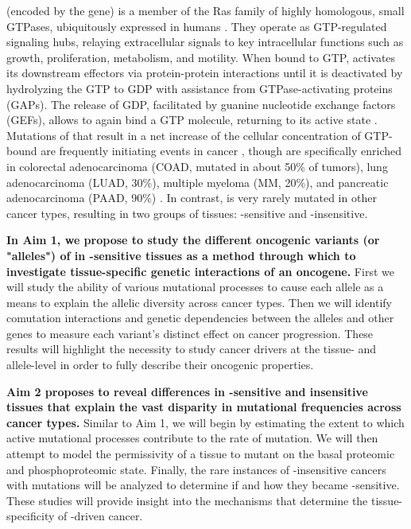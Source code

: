 \kras{} (encoded by the \KRAS{} gene) is a member of the Ras family of highly homologous, small GTPases, ubiquitously expressed in humans \cite{Barbacid1987, Prior2012}. 
They operate as GTP-regulated signaling hubs, relaying extracellular signals to key intracellular functions such as growth, proliferation, metabolism, and motility. 
When bound to GTP, \kras{} activates its downstream effectors via protein-protein interactions until it is deactivated by hydrolyzing the GTP to GDP with assistance from GTPase-activating proteins (GAPs). 
The release of GDP, facilitated by guanine nucleotide exchange factors (GEFs), allows \kras{} to again bind a GTP molecule, returning to its active state \cite{Barbacid1987, Johnson2017}. 
Mutations of \KRAS{} that result in a net increase of the cellular concentration of GTP-bound \kras{} are frequently initiating events in cancer \cite{Kanda2012, Zhang2014a, Li2018, Prior2020TheCancer}, though are specifically enriched in colorectal adenocarcinoma (COAD, mutated in about 50\% of tumors), lung adenocarcinoma (LUAD, 30\%), multiple myeloma (MM, 20\%), and pancreatic adenocarcinoma (PAAD, 90\%) \cite{Prior2020TheCancer}.
In contrast, \KRAS{} is very rarely mutated in other cancer types, resulting in two groups of tissues: \KRAS{}-sensitive and \KRAS{}-insensitive.

\textbf{In Aim 1, we propose to study the different oncogenic variants (or "alleles") of \KRAS{} in \KRAS{}-sensitive tissues as a method through which to investigate tissue-specific genetic interactions of an oncogene.}
First we will study the ability of various mutational processes to cause each allele as a means to explain the allelic diversity across cancer types.
Then we will identify comutation interactions and genetic dependencies between the \KRAS{} alleles and other genes to measure each variant's distinct effect on cancer progression.
These results will highlight the necessity to study cancer drivers at the tissue- and allele-level in order to fully describe their oncogenic properties.

\textbf{Aim 2 proposes to reveal differences in \KRAS{}-sensitive and insensitive tissues that explain the vast disparity in mutational frequencies across cancer types.}
Similar to Aim 1, we will begin by estimating the extent to which active mutational processes contribute to the rate of \KRAS{} mutation.
We will then attempt to model the permissivity of a tissue to mutant \KRAS{} on the basal proteomic and phosphoproteomic state.
Finally, the rare instances of \KRAS{}-insensitive cancers with \KRAS{} mutations will be analyzed to determine if and how they became \KRAS{}-sensitive.
These studies will provide insight into the mechanisms that determine the tissue-specificity of \KRAS{}-driven cancer.


